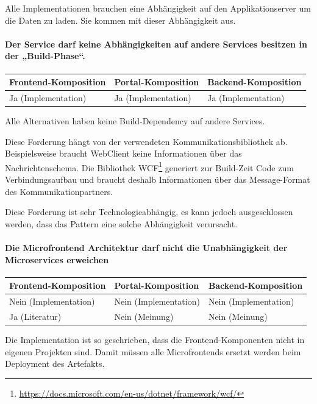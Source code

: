 Alle Implementationen brauchen eine Abhängigkeit auf den Applikationserver um die Daten zu laden. Sie kommen mit dieser Abhängigkeit aus. 

\paragraph{Der Service darf keine Abhängigkeiten auf andere Services besitzen in der „Build-Phase“.}

\begin{tabularx}{\linewidth}{| Y | Y | Y |}
    \hline
    Frontend-Komposition & Portal-Komposition & Backend-Komposition
    \\ \hline
    Ja (Implementation) & Ja (Implementation) & Ja (Implementation) 
    \\ \hline
\end{tabularx}

Alle Alternativen haben keine Build-Dependency auf andere Services. 

Diese Forderung hängt von der verwendeten Kommunikationsbibliothek ab. Beispielsweise braucht WebClient keine Informationen über das Nachrichtenschema. Die Bibliothek WCF\footnote{\url{https://docs.microsoft.com/en-us/dotnet/framework/wcf/}} generiert zur Build-Zeit Code zum Verbindungsaufbau und braucht deshalb Informationen über das Message-Format des Kommunikationpartners.\cite{MicrosoftWCF}

Diese Forderung ist sehr Technologieabhängig, es kann jedoch ausgeschlossen werden, dass das Pattern eine solche Abhängigkeit verursacht.

\paragraph{Die Microfrontend Architektur darf nicht die Unabhängigkeit der Microservices erweichen}

\begin{tabularx}{\linewidth}{| Y | Y | Y |}
    \hline
    Frontend-Komposition & Portal-Komposition & Backend-Komposition
    \\ \hline
    Nein (Implementation) & Nein (Implementation) & Nein (Implementation) 
    \\ \hline
    Ja (Literatur) & Nein (Meinung) & Nein (Meinung)
    \\ \hline
\end{tabularx}

Die Implementation ist so geschrieben, dass die Frontend-Komponenten nicht in eigenen Projekten sind. Damit müssen alle Microfrontends ersetzt werden beim Deployment des Artefakts. 

